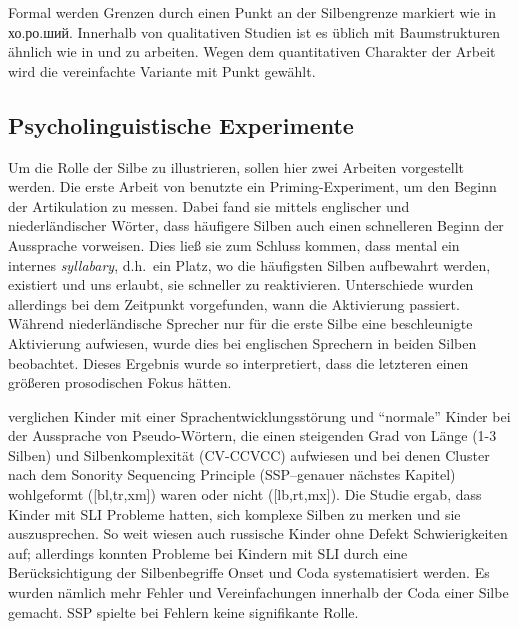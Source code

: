 \documentclass[12pt,headsepline,a4paper]{scrartcl}
\newcommand\textcyr[1]{{\fontencoding{OT2}\fontfamily{wncyr}\selectfont #1}}
\begin{document}
Formal werden Grenzen durch einen Punkt an der Silbengrenze markiert wie in \textcyr{хо.ро.ший}. Innerhalb von qualitativen Studien ist es üblich mit Baumstrukturen ähnlich wie in  und  zu arbeiten. Wegen dem quantitativen Charakter der Arbeit wird die vereinfachte Variante mit Punkt gewählt.


\subsection{Psycholinguistische Experimente}

Um die Rolle der Silbe zu illustrieren, sollen hier zwei Arbeiten vorgestellt werden. Die erste Arbeit von \textcite{cholin2011} benutzte ein Priming-Experiment, um den Beginn der Artikulation zu messen. Dabei fand sie mittels englischer und niederländischer Wörter, dass häufigere Silben auch einen schnelleren Beginn der Aussprache vorweisen. Dies ließ sie zum Schluss kommen, dass mental ein internes \textit{syllabary}, d.h.\ ein Platz, wo die häufigsten Silben aufbewahrt werden, existiert und uns erlaubt, sie schneller zu reaktivieren. Unterschiede wurden allerdings bei dem Zeitpunkt vorgefunden, wann die Aktivierung passiert. Während niederländische Sprecher nur für die erste Silbe eine beschleunigte Aktivierung aufwiesen, wurde dies bei englischen Sprechern in beiden Silben beobachtet. Dieses Ergebnis wurde so interpretiert, dass die letzteren einen größeren prosodischen Fokus hätten.

\textcite{kavi22011} verglichen Kinder mit einer  Sprachentwicklungsstörung und "`normale"' Kinder bei der Aussprache von Pseudo-Wörtern, die einen steigenden Grad von Länge (1-3 Silben) und Silbenkomplexität (CV-CCVCC) aufwiesen und bei denen Cluster nach dem Sonority Sequencing Principle (SSP--genauer nächstes Kapitel) wohlgeformt ([bl,tr,xm]) waren oder nicht ([lb,rt,mx]).
Die Studie ergab, dass Kinder mit SLI Probleme hatten, sich komplexe Silben zu merken und sie auszusprechen. So weit wiesen auch russische Kinder ohne Defekt Schwierigkeiten auf; allerdings konnten Probleme bei Kindern mit SLI durch eine Berücksichtigung der Silbenbegriffe Onset und Coda systematisiert werden. Es wurden nämlich mehr Fehler und Vereinfachungen innerhalb der Coda einer Silbe gemacht. SSP spielte bei Fehlern keine signifikante Rolle.
\end{document}
